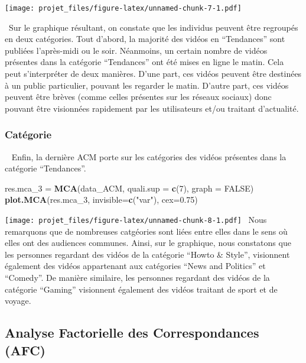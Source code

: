 \documentclass[
]{article}
\newenvironment{Shaded}{\begin{snugshade}}{\end{snugshade}}
\newcommand{\DataTypeTok}[1]{\textcolor[rgb]{0.13,0.29,0.53}{#1}}
\newcommand{\DecValTok}[1]{\textcolor[rgb]{0.00,0.00,0.81}{#1}}
\newcommand{\FloatTok}[1]{\textcolor[rgb]{0.00,0.00,0.81}{#1}}
\newcommand{\KeywordTok}[1]{\textcolor[rgb]{0.13,0.29,0.53}{\textbf{#1}}}
\newcommand{\NormalTok}[1]{#1}
\newcommand{\OtherTok}[1]{\textcolor[rgb]{0.56,0.35,0.01}{#1}}
\newcommand{\StringTok}[1]{\textcolor[rgb]{0.31,0.60,0.02}{#1}}
\begin{document}
\texttt{[image: projet\_files/figure-latex/unnamed-chunk-7-1.pdf]}

 Sur le graphique résultant, on constate que les individus peuvent être
regroupés en deux catégories. Tout d'abord, la majorité des vidéos en
``Tendances'' sont publiées l'après-midi ou le soir. Néanmoins, un
certain nombre de vidéos présentes dans la catégorie ``Tendances'' ont
été mises en ligne le matin. Cela peut s'interpréter de deux manières.
D'une part, ces vidéos peuvent être destinées à un public particulier,
pouvant les regarder le matin. D'autre part, ces vidéos peuvent être
brèves (comme celles présentes sur les réseaux sociaux) donc pouvant
être visionnées rapidement par les utilisateurs et/ou traitant
d'actualité.

\hypertarget{catuxe9gorie}{%
\subsubsection{Catégorie}\label{catuxe9gorie}}

  Enfin, la dernière ACM porte sur les catégories des vidéos présentes
dans la catégorie ``Tendances''.

\begin{Shaded}
\begin{Highlighting}[]
\NormalTok{res.mca_}\DecValTok{3}\NormalTok{ =}\StringTok{ }\KeywordTok{MCA}\NormalTok{(data_ACM, }\DataTypeTok{quali.sup =} \KeywordTok{c}\NormalTok{(}\DecValTok{7}\NormalTok{), }\DataTypeTok{graph =} \OtherTok{FALSE}\NormalTok{)}
\KeywordTok{plot.MCA}\NormalTok{(res.mca_}\DecValTok{3}\NormalTok{, }\DataTypeTok{invisible=}\KeywordTok{c}\NormalTok{(}\StringTok{"var"}\NormalTok{), }\DataTypeTok{cex=}\FloatTok{0.75}\NormalTok{)}
\end{Highlighting}
\end{Shaded}

\texttt{[image: projet\_files/figure-latex/unnamed-chunk-8-1.pdf]}  Nous
remarquons que de nombreuses catgéories sont liées entre elles dans le
sens où elles ont des audiences communes. Ainsi, sur le graphique, nous
constatons que les personnes regardant des vidéos de la catégorie
``Howto \& Style'', visionnent également des vidéos appartenant aux
catégories ``News and Politics'' et ``Comedy''. De manière similaire,
les personnes regardant des vidéos de la catégorie ``Gaming'' visionnent
également des vidéos traitant de sport et de voyage.

\hypertarget{analyse-factorielle-des-correspondances-afc}{%
\subsection{Analyse Factorielle des Correspondances
(AFC)}\label{analyse-factorielle-des-correspondances-afc}}
\end{document}
